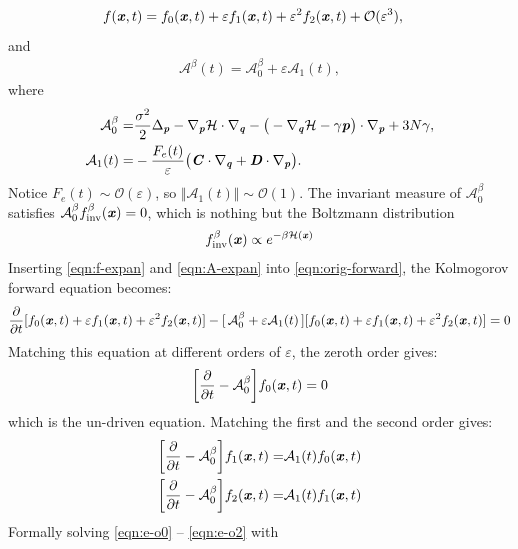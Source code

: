 \documentclass[aip,jcp,a4paper,reprint,onecolumn]{revtex4-1}
\newcommand{\vect}[1]{\textbf{\textit{#1}}}
\newcommand{\inv}{\textrm{inv}}
\newcommand{\mh}{\mathcal H}
\newcommand{\mo}{\mathcal O}
\newcommand{\fwg}{{\mathcal A}}
\begin{document}
\begin{align}\label{eqn:f-expan}
  f(\vect x, t) &= f_0(\vect x, t) + \varepsilon f_1(\vect x, t)
  +\varepsilon^2 f_2(\vect x, t) + \mo (\varepsilon^3),
\end{align}
and 
\begin{align}\label{eqn:A-expan}
  \fwg^\beta(t) = \fwg^\beta_0 + \varepsilon\fwg_1(t),
\end{align}
where
\begin{align}
  \fwg_0^\beta =&
  \frac{\sigma^2}2\Delta_{\vect p}
  -
  \nabla_{\vect p}\mh\cdot\nabla_{\vect q}
  - \big(
  -\nabla_{\vect q}\mh - \gamma\vect p
  \big)\cdot\nabla_{\vect p}
  + 3N\gamma,\\
  \fwg_1(t) =&
  - \frac{F_e(t)}{\varepsilon} \big(
  \vect C \cdot\nabla_{\vect q}
  +
  \vect D \cdot\nabla_{\vect p}
  \big).
\end{align}
Notice $F_e(t) \sim \mo(\varepsilon)$, so $\Vert\fwg_1(t)\Vert\sim\mo(1)$.
The invariant measure of $\fwg^\beta_0$ satisfies $\fwg^\beta_0f^\beta_{\inv}(\vect x) = 0$,
which is nothing but the Boltzmann distribution
\begin{align}
  f^\beta_{\inv}(\vect x) \propto e^{-\beta\mh(\vect x)}
\end{align}
Inserting \eqref{eqn:f-expan} and \eqref{eqn:A-expan} into
\eqref{eqn:orig-forward}, 
the Kolmogorov forward equation becomes:
\begin{align}
  \frac{\partial}{\partial t}
  [f_0(\vect x, t) + \varepsilon  f_1(\vect x, t) + \varepsilon^2f_2(\vect x, t)]
  -
  [\,\fwg^\beta_0 + \varepsilon\fwg_1(t)\,]
  [f_0(\vect x, t) + \varepsilon  f_1(\vect x, t) + \varepsilon^2f_2(\vect x, t)]
  = 0
\end{align}
Matching this equation at different orders of $\varepsilon$, the zeroth
order gives:
\begin{align}\label{eqn:e-o0}
  \bigg[
  \frac{\partial}{\partial t}
  - \fwg_0^\beta
  \bigg]
  f_0(\vect x, t)
  = 0
\end{align}
which is the un-driven equation. Matching the first and the second order gives:
\begin{align}\label{eqn:e-o1}
  \bigg[
  \frac{\partial}{\partial t}
  - \fwg_0^\beta
  \bigg]
  f_1(\vect x, t)
  =&
  \fwg_1(t) f_0(\vect x, t)\\\label{eqn:e-o2}
  \bigg[
  \frac{\partial}{\partial t}
  - \fwg_0^\beta
  \bigg]
  f_2(\vect x, t)
  =&
  \fwg_1(t) f_1(\vect x, t)
\end{align}
Formally solving \eqref{eqn:e-o0} -- \eqref{eqn:e-o2} with
\end{document}
